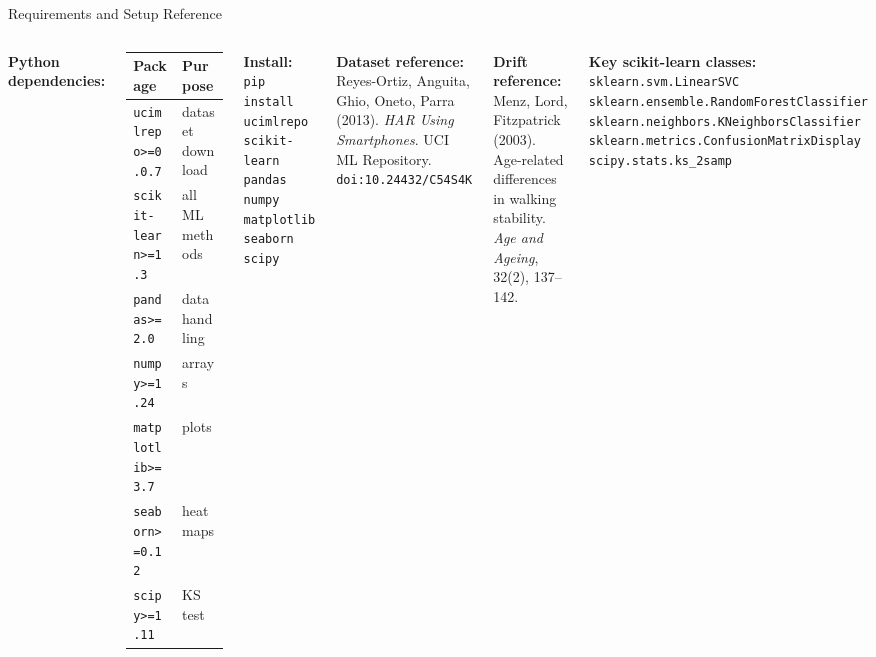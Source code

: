 \documentclass[aspectratio=169,11pt]{beamer}
\begin{document}
\begin{frame}{Requirements and Setup Reference}
    \begin{columns}
        \textbf{Python dependencies:}
        \begin{tabular}{ll}
            \toprule
            \textbf{Package} & \textbf{Purpose} \\
            \midrule
            \texttt{ucimlrepo>=0.0.7} & dataset download \\
            \texttt{scikit-learn>=1.3} & all ML methods \\
            \texttt{pandas>=2.0}      & data handling \\
            \texttt{numpy>=1.24}      & arrays \\
            \texttt{matplotlib>=3.7}  & plots \\
            \texttt{seaborn>=0.12}    & heatmaps \\
            \texttt{scipy>=1.11}      & KS test \\
            \bottomrule
        \end{tabular}

        \vspace{0.2cm}
        \textbf{Install:}\\
        {\small \texttt{pip install ucimlrepo scikit-learn}}\\
        {\small \texttt{pandas numpy matplotlib seaborn scipy}}

        \textbf{Dataset reference:}\\
        Reyes-Ortiz, Anguita, Ghio, Oneto, Parra (2013). \textit{HAR Using Smartphones}. UCI ML Repository. \texttt{doi:10.24432/C54S4K}

        \vspace{0.2cm}
        \textbf{Drift reference:}\\
        Menz, Lord, Fitzpatrick (2003). Age-related differences in walking stability. \textit{Age and Ageing}, 32(2), 137--142.

        \vspace{0.2cm}
        \textbf{Key scikit-learn classes:}\\
        \texttt{sklearn.svm.LinearSVC}\\
        \texttt{sklearn.ensemble.RandomForestClassifier}\\
        \texttt{sklearn.neighbors.KNeighborsClassifier}\\
        \texttt{sklearn.metrics.ConfusionMatrixDisplay}\\
        \texttt{scipy.stats.ks\_2samp}
    \end{columns}
\end{frame}
\end{document}
